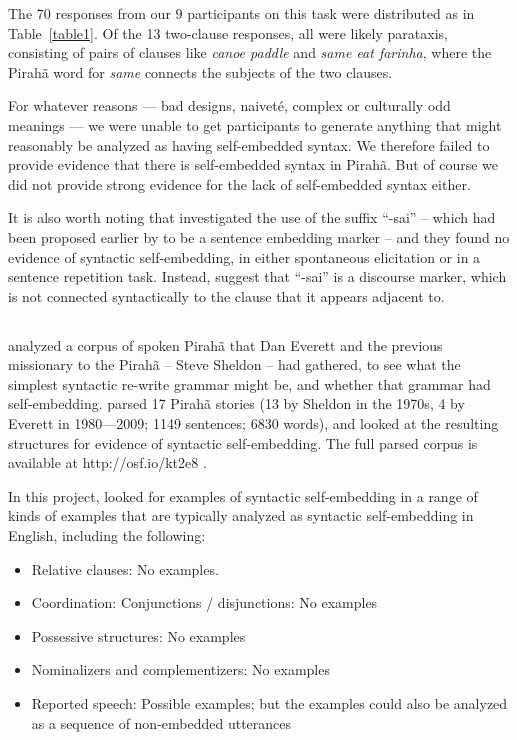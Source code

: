 \documentclass{article}
\begin{document}
The 70 responses from our 9 participants on this task were distributed as in Table~\ref{table1}.  Of the 13 two-clause responses, all were likely parataxis, consisting of pairs of clauses like \textit{canoe paddle} and \textit{same eat farinha}, where the Pirahã word for \textit{same} connects the subjects of the two clauses.

For whatever reasons — bad designs, naiveté, complex or culturally odd meanings — we were unable to get participants to generate anything that might reasonably be analyzed as having self-embedded syntax. We therefore failed to provide evidence that there is self-embedded syntax in Pirahã.  But of course we did not provide strong evidence for the lack of self-embedded syntax either.

It is also worth noting that \cite{sakel2010piraha} investigated the use of the suffix ``-sai'' -- which had been proposed earlier by \cite{everett1986piraha} to be a sentence embedding marker -- and they found no evidence of syntactic self-embedding, in either spontaneous elicitation or in a sentence repetition task. Instead, \cite{sakel2010piraha} suggest that ``-sai'' is a discourse marker, which is not connected syntactically to the clause that it appears adjacent to.

\subsection{}

\citet{futrell2016corpus} analyzed a corpus of spoken Pirahã that Dan Everett and the previous missionary to the Pirahã -- Steve Sheldon -- had gathered, to see what the simplest syntactic re-write grammar might be, and whether that grammar had self-embedding. \cite{futrell2016corpus} parsed 17 Pirahã stories (13 by Sheldon in the 1970s, 4 by Everett in 1980—2009; 1149 sentences; 6830 words), and looked at the resulting structures for evidence of syntactic self-embedding. The full parsed corpus is available at http://osf.io/kt2e8 .

In this project, \cite{futrell2016corpus} looked for examples of syntactic self\hyp embedding in a range of kinds of examples that are typically analyzed as syntactic self-embedding in English, including the following:

\begin{itemize}
    \item Relative clauses: No examples.
    \item Coordination: Conjunctions / disjunctions: No examples 
    \item Possessive structures: No examples
    \item Nominalizers and complementizers: No examples
    \item Reported speech: Possible examples; but the examples could also be analyzed as a sequence of non-embedded utterances
\end{itemize} 
\end{document}
